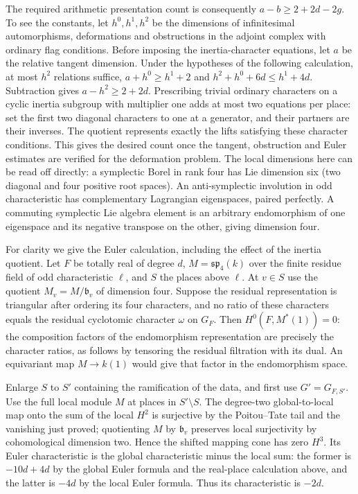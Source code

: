 \documentclass[11pt]{amsart}
\theoremstyle{definition}
\theoremstyle{remark}
\begin{document}
The required arithmetic presentation count is consequently
$a-b\ge 2+2d-2g$. To see the constants, let $h^0,h^1,h^2$ be
the dimensions of infinitesimal automorphisms, deformations and
obstructions in the adjoint complex with ordinary flag conditions.
Before imposing the inertia-character equations, let $a$ be the
relative tangent dimension. Under the hypotheses of the following calculation,
at most $h^2$ relations suffice, $a+h^0\ge h^1+2$ and
$h^2+h^0+6d\le h^1+4d$. Subtraction gives $a-h^2\ge2+2d$.
Prescribing trivial ordinary characters on a cyclic inertia subgroup
with multiplier one adds at most two equations per place: set the
first two diagonal characters to one at a generator, and their
partners are their inverses. The quotient represents exactly the
lifts satisfying these character conditions. This gives the desired
count once the tangent, obstruction and Euler estimates are verified
for the deformation problem. The local dimensions here can be read
off directly: a symplectic Borel in rank four has Lie dimension six
(two diagonal and four positive root spaces). An anti-symplectic
involution in odd characteristic has complementary Lagrangian
eigenspaces, paired perfectly. A commuting symplectic Lie algebra
element is an arbitrary endomorphism of one eigenspace and its
negative transpose on the other, giving dimension four.

For clarity we give the Euler calculation, including the effect of
the inertia quotient. Let $F$ be totally real of degree $d$,
$M=\mathfrak{sp}_4(k)$ over the finite residue field of odd
characteristic $\ell$, and $S$ the places above $\ell$.
At $v\in S$ use the quotient $M_v=M/\mathfrak b_v$ of dimension
four. Suppose the residual representation is triangular after
ordering its four characters, and no ratio of these characters
equals the residual cyclotomic character $\omega$ on $G_F$.
Then $H^0(F,M^*(1))=0$: the composition factors of the endomorphism
representation are precisely the character ratios, as follows by
tensoring the residual filtration with its dual. An equivariant map
$M\to k(1)$ would give that factor in the endomorphism space.

Enlarge $S$ to $S'$ containing the ramification of the data, and
first use $G'=G_{F,S'}$. Use the full local module $M$ at places
in $S'\setminus S$. The degree-two global-to-local map onto the
sum of the local $H^2$ is surjective by the Poitou--Tate tail and
the vanishing just proved; quotienting $M$ by $\mathfrak b_v$
preserves local surjectivity by cohomological dimension two.
Hence the shifted mapping cone has zero $H^3$. Its Euler
characteristic is the global characteristic minus the local sum:
the former is $-10d+4d$ by the global Euler formula and the
real-place calculation above, and the latter is $-4d$ by the
local Euler formula. Thus its characteristic is $-2d$.
\end{document}
